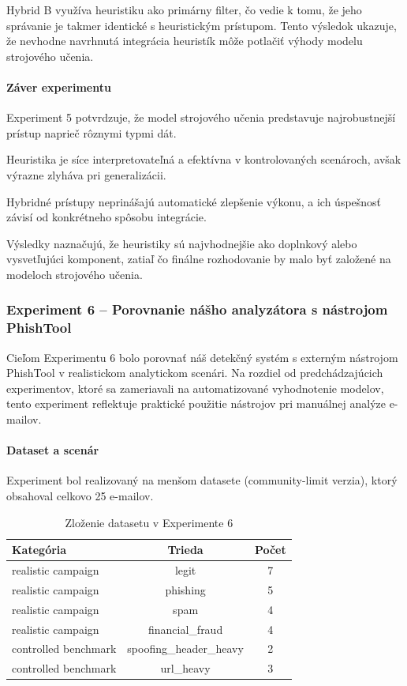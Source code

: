 \documentclass[conference]{IEEEtran}
\begin{document}
Hybrid B využíva heuristiku ako primárny filter,
čo vedie k tomu, že jeho správanie je takmer identické
s heuristickým prístupom. Tento výsledok ukazuje,
že nevhodne navrhnutá integrácia heuristík môže potlačiť
výhody modelu strojového učenia.

\paragraph{Záver experimentu}

Experiment 5 potvrdzuje, že model strojového učenia predstavuje
najrobustnejší prístup naprieč rôznymi typmi dát.

Heuristika je síce interpretovateľná a efektívna v kontrolovaných scenároch,
avšak výrazne zlyháva pri generalizácii.

Hybridné prístupy neprinášajú automatické zlepšenie výkonu,
a ich úspešnosť závisí od konkrétneho spôsobu integrácie.

Výsledky naznačujú, že heuristiky sú najvhodnejšie ako doplnkový
alebo vysvetľujúci komponent, zatiaľ čo finálne rozhodovanie
by malo byť založené na modeloch strojového učenia.


\subsubsection{Experiment 6 – Porovnanie nášho analyzátora s nástrojom PhishTool}

Cieľom Experimentu 6 bolo porovnať náš detekčný systém s externým nástrojom
PhishTool v realistickom analytickom scenári. Na rozdiel od predchádzajúcich
experimentov, ktoré sa zameriavali na automatizované vyhodnotenie modelov,
tento experiment reflektuje praktické použitie nástrojov pri manuálnej
analýze e-mailov.

\paragraph{Dataset a scenár}

Experiment bol realizovaný na menšom datasete (community-limit verzia),
ktorý obsahoval celkovo 25 e-mailov.

\begin{table}[!t]
\centering
\caption{Zloženie datasetu v Experimente 6}
\label{tab:exp6_dataset}
\footnotesize
\setlength{\tabcolsep}{4pt}
\renewcommand{\arraystretch}{1.1}
\begin{tabular}{lcc}
\toprule
\textbf{Kategória} & \textbf{Trieda} & \textbf{Počet} \\
\midrule
realistic campaign & legit & 7 \\
realistic campaign & phishing & 5 \\
realistic campaign & spam & 4 \\
realistic campaign & financial\_fraud & 4 \\
\midrule
controlled benchmark & spoofing\_header\_heavy & 2 \\
controlled benchmark & url\_heavy & 3 \\
\bottomrule
\end{tabular}
\end{table}
\end{document}
